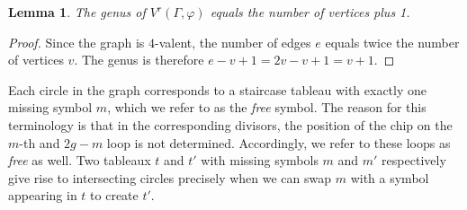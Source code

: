\documentclass[11pt,reqno]{amsart}
\theoremstyle{definition}
\theoremstyle{problem}
\theoremstyle{plain}
\newtheorem{theorem}[definition]{Theorem}
\newtheorem{lemma}[definition]{Lemma}
\theoremstyle{remark}
\theoremstyle{theorem}
\numberwithin{equation}{section}
\numberwithin{figure}{section}
\begin{document}
 \begin{lemma} \label{genuslemma}
	The genus of $V^r(\Gamma,\varphi)$ equals the number of vertices plus 1.
\end{lemma}

\begin{proof}
	Since the graph is $4$-valent, the number of edges $e$ equals twice the number of vertices $v$. The genus is therefore $e-v+1 = 2v-v+1=v+1$. 
\end{proof}

Each circle in the graph corresponds to a staircase tableau with exactly one missing symbol $m$, which we refer to as the \emph{free} symbol.  The reason for this terminology is that in the corresponding divisors, the position of the chip on the $m$-th and $2g-m$ loop is not determined. Accordingly, we refer to these loops as \emph{free} as well. 
Two tableaux $t$ and $t'$ with missing symbols $m$ and $m'$ respectively give rise to intersecting circles precisely when we can swap $m$ with a symbol appearing in $t$ to create $t'$. 

%







\end{document}
